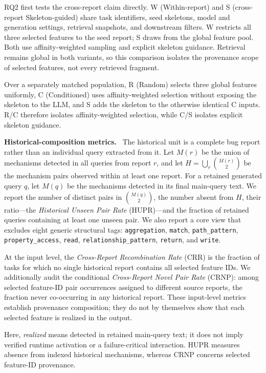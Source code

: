 \documentclass[acmsmall,screen,anonymous]{acmart}
\newcommand{\cnpara}[1]{\par\noindent\textbf{#1.}\ }
\begin{document}
RQ2 first tests the cross-report claim directly. W (Within-report) and S (cross-report Skeleton-guided) share task identifiers, seed skeletons, model and generation settings, retrieval snapshots, and downstream filters. W restricts all three selected features to the seed report; S draws from the global feature pool. Both use affinity-weighted sampling and explicit skeleton guidance. Retrieval remains global in both variants, so this comparison isolates the provenance scope of selected features, not every retrieved fragment.

Over a separately matched population, R (Random) selects three global features uniformly, C (Conditioned) uses affinity-weighted selection without exposing the skeleton to the LLM, and S adds the skeleton to the otherwise identical C inputs. R/C therefore isolates affinity-weighted selection, while C/S isolates explicit skeleton guidance.




\cnpara{Historical-composition metrics}
The historical unit is a complete bug report rather than an individual query extracted from it. Let $M(r)$ be the union of mechanisms detected in all queries from report $r$, and let $H=\bigcup_r \binom{M(r)}{2}$ be the mechanism pairs observed within at least one report. For a retained generated query $q$, let $M(q)$ be the mechanisms detected in its final main-query text. We report the number of distinct pairs in $\binom{M(q)}{2}$, the number absent from $H$, their ratio---the \emph{Historical Unseen Pair Rate} (HUPR)---and the fraction of retained queries containing at least one unseen pair. We also report a core view that excludes eight generic structural tags: \texttt{aggregation}, \texttt{match}, \texttt{path\_pattern}, \texttt{property\_access}, \texttt{read}, \texttt{relationship\_pattern}, \texttt{return}, and \texttt{write}.

At the input level, the \emph{Cross-Report Recombination Rate} (CRR) is the fraction of tasks for which no single historical report contains all selected feature IDs. We additionally audit the conditional \emph{Cross-Report Novel Pair Rate} (CRNP): among selected feature-ID pair occurrences assigned to different source reports, the fraction never co-occurring in any historical report. These input-level metrics establish provenance composition; they do not by themselves show that each selected feature is realized in the output.

Here, \emph{realized} means detected in retained main-query text; it does not imply verified runtime activation or a failure-critical interaction. HUPR measures absence from indexed historical mechanisms, whereas CRNP concerns selected feature-ID provenance.
\end{document}
